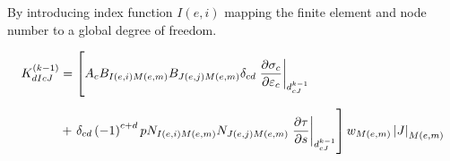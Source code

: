 \documentclass[main.tex]{subfiles}
\begin{document}
By introducing index function $I(e,i)$ mapping the finite element and node number to a global degree of freedom.

\begin{align} \label{eq:ARAd}
K_{dIcJ}^{(k-1)} 
& = 
\left[
A_c 
B_{I(e,i)M(e,m)} B_{J(e,j)M(e,m)} 
\delta_{cd}
\left.\mbox{$\displaystyle\frac{\partial {\sigma_c}}{\partial {\varepsilon_{c}}}$}\right|_{d_{cJ}^{k-1}}
\right.
\\[2mm]
& 
+
\left.
\delta_{cd}
\left(-1\right)^{c+d}
p 
N_{I(e,i)M(e,m)} N_{J(e,j)M(e,m)} 
\left.\mbox{$\displaystyle\frac{\partial {\tau}}{\partial {s}}$}\right|_{d_{cJ}^{k-1}}
\right]
w_{M(e,m)} 
\left| J \right|_{M(e,m)}
\end{align}
\end{document}
